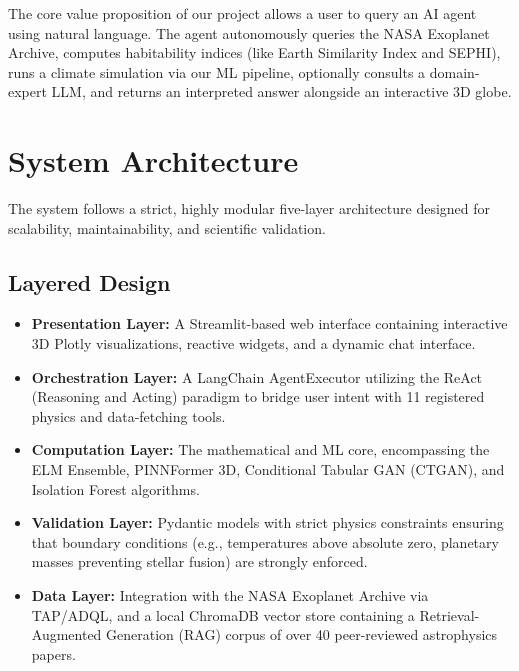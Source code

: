 \documentclass[12pt,a4paper]{article}
\begin{document}
The core value proposition of our project allows a user to query an AI agent using natural language. The agent autonomously queries the NASA Exoplanet Archive, computes habitability indices (like Earth Similarity Index and SEPHI), runs a climate simulation via our ML pipeline, optionally consults a domain-expert LLM, and returns an interpreted answer alongside an interactive 3D globe. 

\section{System Architecture}

The system follows a strict, highly modular five-layer architecture designed for scalability, maintainability, and scientific validation. 

\subsection{Layered Design}
\begin{itemize}
    \item \textbf{Presentation Layer:} A Streamlit-based web interface containing interactive 3D Plotly visualizations, reactive widgets, and a dynamic chat interface.
    \item \textbf{Orchestration Layer:} A LangChain AgentExecutor utilizing the ReAct (Reasoning and Acting) paradigm to bridge user intent with 11 registered physics and data-fetching tools.
    \item \textbf{Computation Layer:} The mathematical and ML core, encompassing the ELM Ensemble, PINNFormer 3D, Conditional Tabular GAN (CTGAN), and Isolation Forest algorithms.
    \item \textbf{Validation Layer:} Pydantic models with strict physics constraints ensuring that boundary conditions (e.g., temperatures above absolute zero, planetary masses preventing stellar fusion) are strongly enforced.
    \item \textbf{Data Layer:} Integration with the NASA Exoplanet Archive via TAP/ADQL, and a local ChromaDB vector store containing a Retrieval-Augmented Generation (RAG) corpus of over 40 peer-reviewed astrophysics papers.
\end{itemize}
\end{document}
